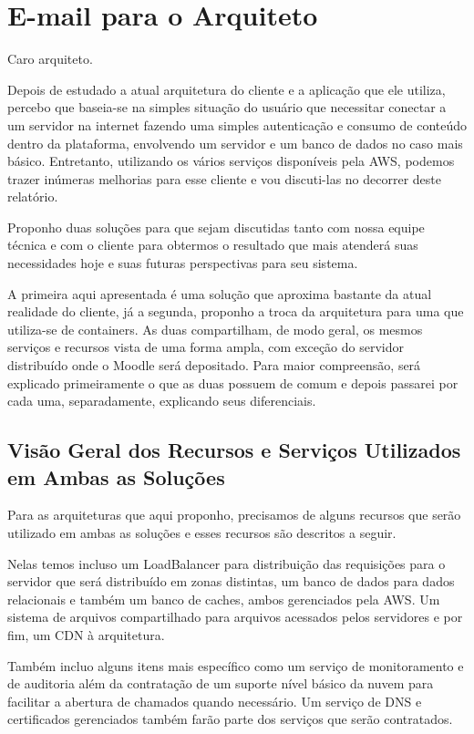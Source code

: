 \documentclass{article}
\begin{document}
\section{E-mail para o Arquiteto}
Caro arquiteto.

Depois de estudado a atual arquitetura do cliente e a aplicação que ele utiliza, percebo que baseia-se na simples situação do usuário que necessitar conectar a um servidor na internet fazendo uma simples autenticação e consumo de conteúdo dentro da plataforma, envolvendo um servidor e um banco de dados no caso mais básico. Entretanto, utilizando os vários serviços disponíveis pela AWS, podemos trazer inúmeras melhorias para esse cliente e vou discuti-las no decorrer deste relatório.

Proponho duas soluções para que sejam discutidas tanto com nossa equipe técnica e com o cliente para obtermos o resultado que mais atenderá suas necessidades hoje e suas futuras perspectivas para seu sistema.

A primeira aqui apresentada é uma solução que aproxima bastante da atual realidade do cliente, já a segunda, proponho a troca da arquitetura para uma que utiliza-se de containers. 
As duas compartilham, de modo geral, os mesmos serviços e recursos vista de uma forma ampla, com exceção do servidor distribuído onde o Moodle será depositado. 
Para maior compreensão, será explicado primeiramente o que as duas possuem de comum e depois passarei por cada uma, separadamente, explicando seus diferenciais.

\subsection{Visão Geral dos Recursos e Serviços Utilizados em Ambas as Soluções}

Para as arquiteturas que aqui proponho, precisamos de alguns recursos que serão utilizado em ambas as soluções e esses recursos são descritos a seguir.

Nelas temos incluso um LoadBalancer para distribuição das requisições para o servidor que será distribuído em zonas distintas, um banco de dados para dados relacionais e também um banco de caches, ambos gerenciados pela AWS. 
Um sistema de arquivos compartilhado para arquivos acessados pelos servidores e por fim, um CDN à arquitetura. 

Também incluo alguns itens mais específico como um serviço de monitoramento e de auditoria além da contratação de um suporte nível básico da nuvem para facilitar a abertura de chamados quando necessário. Um serviço de DNS e certificados gerenciados também farão parte dos serviços que serão contratados.
\end{document}
